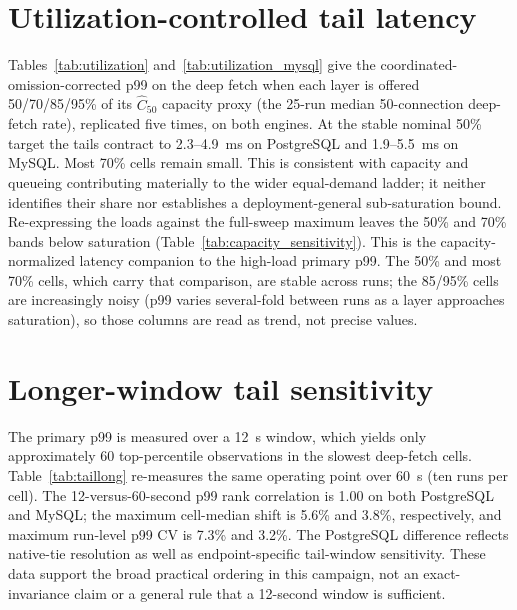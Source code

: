 \documentclass[11pt,a4paper]{article}
\newcommand{\tabledir}{tables/}
\begin{document}
\section{Utilization-controlled tail latency}
\label{sup:utilization}
Tables~\ref{tab:utilization} and~\ref{tab:utilization_mysql} give the
coordinated-omission-corrected p99 on the deep fetch when each layer is offered
50/70/85/95\% of its $\widehat C_{50}$ capacity proxy (the 25-run median
50-connection deep-fetch rate), replicated five times, on both engines. At the stable nominal 50\% target the tails contract to 2.3--4.9~ms on PostgreSQL and 1.9--5.5~ms on MySQL. Most 70\% cells remain small. This is consistent with capacity and queueing contributing materially to the wider equal-demand ladder; it neither identifies their share nor establishes a deployment-general sub-saturation bound. Re-expressing the loads against the
full-sweep maximum leaves the 50\% and 70\% bands below saturation (Table~\ref{tab:capacity_sensitivity}). This is the
capacity-normalized latency
companion to the high-load primary p99. The 50\% and most 70\% cells, which carry that
comparison, are stable across runs; the 85/95\% cells are increasingly noisy (p99
varies several-fold between runs as a layer approaches saturation), so those columns
are read as trend, not precise values.




\section{Longer-window tail sensitivity}
\label{sup:taillong}
The primary p99 is measured over a 12~s window, which yields only approximately
60 top-percentile observations in the slowest deep-fetch cells. Table~\ref{tab:taillong}
re-measures the same operating point over 60~s (ten runs per cell). The
12-versus-60-second p99 rank correlation is 1.00 on both PostgreSQL and MySQL;
the maximum cell-median shift is 5.6\% and 3.8\%, respectively, and maximum
run-level p99 CV is 7.3\% and 3.2\%. The PostgreSQL difference reflects native-tie
resolution as well as endpoint-specific tail-window sensitivity. These data support
the broad practical ordering in this campaign, not an exact-invariance claim or a
general rule that a 12-second window is sufficient.


\end{document}
